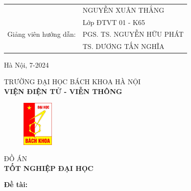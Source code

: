 \begin{titlepage}
\begin{center}
\begin{table}[H]
\begin{tabular}{l l}
     & \fontsize{14pt}{0pt}\selectfont NGUYỄN XUÂN THẮNG \vspace{6pt} \\ 
     &\fontsize{14pt}{0pt}\selectfont Lớp ĐTVT 01 - K65 \vspace{6pt}\\
\fontsize{14pt}{0pt}\selectfont Giảng viên hướng dẫn: & \fontsize{14pt}{0pt}\selectfont PGS. TS. NGUYỄN HỮU PHÁT \\
& \fontsize{14pt}{0pt}\selectfont TS. DƯƠNG TẤN NGHĨA
\end{tabular}
\end{table}
\vspace{0.5cm}
 \fontsize{14pt}{0pt}\selectfont Hà Nội, 7-2024
\end{center}
\end{titlepage}
\cleardoublepage
\thispagestyle{empty}
\begin{center}
\vspace{-12pt}  TRƯỜNG ĐẠI HỌC BÁCH KHOA HÀ NỘI \\
\textbf{\fontsize{16pt}{0pt}\selectfont VIỆN ĐIỆN TỬ - VIỄN THÔNG}
\vspace{0.5cm}
 \begin{figure}[H]
     \centering
     \includegraphics[width=1.53cm,height=2.26cm]{Images/hust.png}
 \end{figure}
\vspace{1.5cm}
\fontsize{24pt}{0pt}\selectfont ĐỒ ÁN\\
\vspace{12pt}
\textbf{\fontsize{32pt}{0pt}\selectfont TỐT NGHIỆP ĐẠI HỌC}
\vspace{1.5cm}
\end{center}
\hspace{6pt}\textbf{\fontsize{14pt}{0pt}\selectfont Đề tài:}
